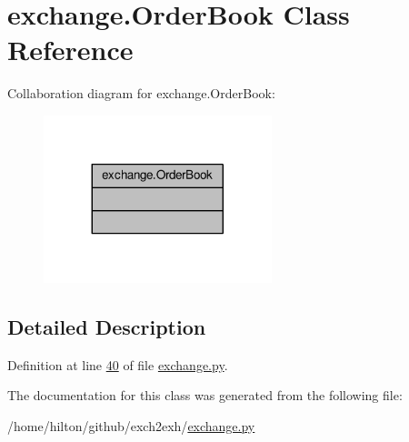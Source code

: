 \hypertarget{classexchange_1_1_order_book}{}\section{exchange.\+Order\+Book Class Reference}
\label{classexchange_1_1_order_book}


Collaboration diagram for exchange.\+Order\+Book\+:\nopagebreak
\begin{figure}[H]
\begin{center}
\leavevmode
\includegraphics[width=188pt]{classexchange_1_1_order_book__coll__graph}
\end{center}
\end{figure}


\subsection{Detailed Description}


Definition at line \hyperlink{exchange_8py_source_l00040}{40} of file \hyperlink{exchange_8py_source}{exchange.\+py}.



The documentation for this class was generated from the following file\+:\begin{DoxyCompactItemize}
\item 
/home/hilton/github/exch2exh/\hyperlink{exchange_8py}{exchange.\+py}\end{DoxyCompactItemize}
